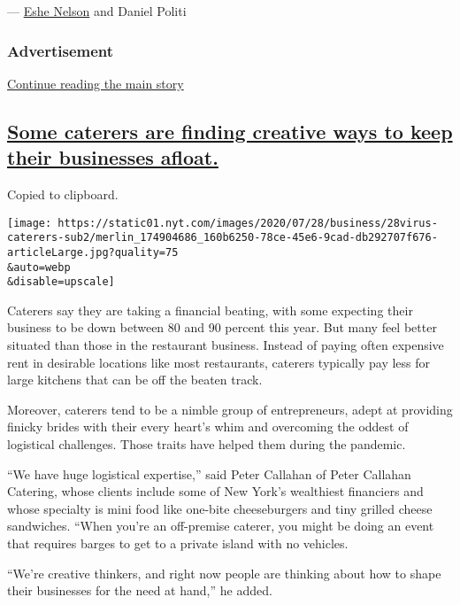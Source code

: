 --- \href{https://www.nytimes.com/by/eshe-nelson}{Eshe Nelson} and
Daniel Politi

\hypertarget{advertisement-2}{%
\subsubsection{Advertisement}\label{advertisement-2}}

\protect\hyperlink{after-dfp-ad-mid3}{Continue reading the main story}

\hypertarget{some-caterers-are-finding-creative-ways-to-keep-their-businesses-afloat}{%
\subsection{\texorpdfstring{\protect\hyperlink{some-caterers-are-finding-creative-ways-to-keep-their-businesses-afloat}{Some
caterers are finding creative ways to keep their businesses
afloat.}}{Some caterers are finding creative ways to keep their businesses afloat.}}\label{some-caterers-are-finding-creative-ways-to-keep-their-businesses-afloat}}

Copied to clipboard.

\texttt{[image: https://static01.nyt.com/images/2020/07/28/business/28virus-caterers-sub2/merlin\_174904686\_160b6250-78ce-45e6-9cad-db292707f676-articleLarge.jpg?quality=75\\\&auto=webp\\\&disable=upscale]}

Caterers say they are taking a financial beating, with some expecting
their business to be down between 80 and 90 percent this year. But many
feel better situated than those in the restaurant business. Instead of
paying often expensive rent in desirable locations like most
restaurants, caterers typically pay less for large kitchens that can be
off the beaten track.

Moreover, caterers tend to be a nimble group of entrepreneurs, adept at
providing finicky brides with their every heart's whim and overcoming
the oddest of logistical challenges. Those traits have helped them
during the pandemic.

``We have huge logistical expertise,'' said Peter Callahan of Peter
Callahan Catering, whose clients include some of New York's wealthiest
financiers and whose specialty is mini food like one-bite cheeseburgers
and tiny grilled cheese sandwiches. ``When you're an off-premise
caterer, you might be doing an event that requires barges to get to a
private island with no vehicles.

``We're creative thinkers, and right now people are thinking about how
to shape their businesses for the need at hand,'' he added.

